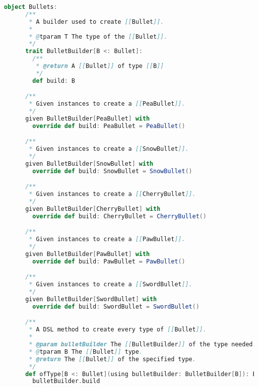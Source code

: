 \begin{lstlisting}[language=Scala, label=code:troop-builder, caption= Builder per la creazione di una Troop.]
object Bullets:
      /**
       * A builder used to create [[Bullet]].
       *
       * @tparam T The type of the [[Bullet]].
       */
      trait BulletBuilder[B <: Bullet]:
        /**
         * @return A [[Bullet]] of type [[B]]
         */
        def build: B

      /**
       * Given instances to create a [[PeaBullet]].
       */
      given BulletBuilder[PeaBullet] with
        override def build: PeaBullet = PeaBullet()

      /**
       * Given instances to create a [[SnowBullet]].
       */
      given BulletBuilder[SnowBullet] with
        override def build: SnowBullet = SnowBullet()

      /**
       * Given instances to create a [[CherryBullet]].
       */
      given BulletBuilder[CherryBullet] with
        override def build: CherryBullet = CherryBullet()

      /**
       * Given instances to create a [[PawBullet]].
       */
      given BulletBuilder[PawBullet] with
        override def build: PawBullet = PawBullet()

      /**
       * Given instances to create a [[SwordBullet]].
       */
      given BulletBuilder[SwordBullet] with
        override def build: SwordBullet = SwordBullet()

      /**
       * A DSL method to create every type of [[Bullet]].
       *
       * @param bulletBuilder The [[BulletBuilder]] of the type needed.
       * @tparam B The [[Bullet]] type.
       * @return The [[Bullet]] of the specified type.
       */
      def ofType[B <: Bullet](using bulletBuilder: BulletBuilder[B]): B =
        bulletBuilder.build
\end{lstlisting}